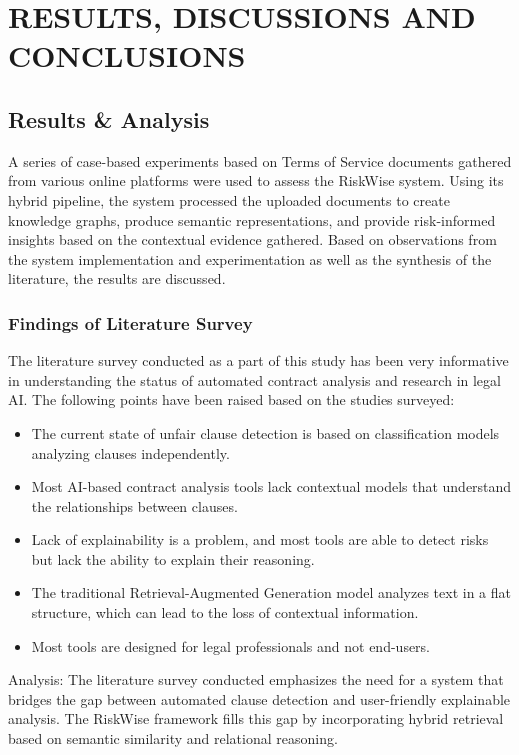 \chapter{RESULTS, DISCUSSIONS AND CONCLUSIONS} %
\label{ChapterResults} %

\section{Results \& Analysis}
A series of case-based experiments based on Terms of Service
documents gathered from various online platforms were used to assess
the RiskWise system. Using its hybrid pipeline, the system processed
the uploaded documents to create knowledge graphs, produce semantic
representations, and provide risk-informed insights based on the
contextual evidence gathered. Based on observations from the system
implementation and experimentation as well as the synthesis of the
literature, the results are discussed.

\subsection{Findings of Literature Survey}
The literature survey conducted as a part of this study has been very
informative in understanding the status of automated contract
analysis and research in legal AI. The following points have been
raised based on the studies surveyed:
\begin{itemize}
  \item The current state of unfair clause detection is based on
    classification models analyzing clauses independently.
  \item Most AI-based contract analysis tools lack contextual models
    that understand the relationships between clauses.
  \item Lack of explainability is a problem, and most tools are able
    to detect risks but lack the ability to explain their reasoning.
  \item The traditional Retrieval-Augmented Generation model analyzes
    text in a flat structure, which can lead to the loss of
    contextual information.
  \item Most tools are designed for legal professionals and not end-users.
\end{itemize}
Analysis:
The literature survey conducted emphasizes the need for a system that
bridges the gap between automated clause detection and user-friendly
explainable analysis. The RiskWise framework fills this gap by
incorporating hybrid retrieval based on semantic similarity and
relational reasoning.

